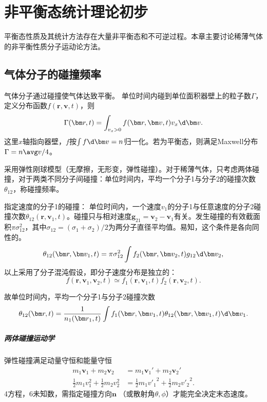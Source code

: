 \newcommand*{\df}{\mathrm d}
\newcommand*{\cll}{\mathrm c}

\chapter{非平衡态统计理论初步}

平衡态性质及其统计方法存在大量非平衡态和不可逆过程。本章主要讨论稀薄气体的非平衡性质分子运动论方法。

\section{气体分子的碰撞频率}

气体分子通过碰撞使气体达致平衡。
单位时间内碰到单位面积器壁上的粒子数$\Gamma$，定义分布函数$f(\bm r,\bm v,t)$，则
\[
	\Gamma(\bm r,t)=\int_{v_x>0}f(\bm r,\bm v,t)v_x\d\bm v.
\]
这里$x$轴指向器壁，$f$按$\int f\d\bm v=n$归一化。若为平衡态，则满足Maxwell分布$\Gamma=n\avg v/4$。

采用弹性刚球模型（无摩擦，无形变，弹性碰撞）。对于稀薄气体，只考虑两体碰撞，对于两类不同分子间碰撞：单位时间内，平均一个分子1与分子2的碰撞次数$\theta_{12}$，称碰撞频率。

指定速度的分子1的碰撞：
单位时间内，一个速度$v_1$的分子1与任意速度的分子2碰撞次数$\theta_{12}(\bm r,\bm v_1,t)$。碰撞只与相对速度$\bm g_{21}=\bm v_2-\bm v_1$有关。发生碰撞的有效截面积$\pi\sigma^2_{12}$，其中$\sigma_{12}=(\sigma_1+\sigma_2)/2$为两分子直径平均值。易知，这个条件是各向同性的。
\begin{align}
	\theta_{12}(\bm r,\bm v_1,t)=\pi\sigma_{12}^2\int f_2(\bm r,\bm v_2,t)g_{12}\d\bm v_2,
\end{align}
以上采用了分子混沌假设，即分子速度分布是独立的：
\[
	f(\bm r,\bm v_1,\bm v_2,t)\simeq f_1(\bm r,\bm v_1,t)f_2(\bm r,\bm v_2,t).
\]

故单位时间内，平均一个分子1与分子2碰撞次数
\begin{align}
	\theta_{12}(\bm r,t)=\frac1{n_1(\bm r_1,t)}\int f_1(\bm r,\bm v_1,t)\theta_{12}(\bm r,\bm v_1,t)\d\bm v_1.
\end{align}
\paragraph{两体碰撞运动学}
弹性碰撞满足动量守恒和能量守恒
\begin{align}
	m_1\bm v_1+m_2\bm v_2&=m_1\bm v_1'+m_2\bm v_2'\\
	\frac12m_1v_1^2+\frac12m_2v_2^2&=\frac12m_1{v'_1}^2+\frac12m_2{v'_2}^2.
\end{align}
4方程，6未知数，需指定碰撞方向$\bm n$ （或散射角$\theta,\phi$）才能完全决定末态速度。

